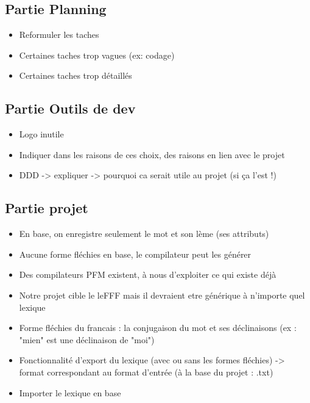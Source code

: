 \documentclass{article}
\begin{document}
\subsection{Partie Planning}
\begin{itemize}
    \item Reformuler les taches
    \item Certaines taches trop vagues (ex: codage)
    \item Certaines taches trop détaillés
\end{itemize}

\subsection{Partie Outils de dev}
\begin{itemize}
    \item Logo inutile
    \item Indiquer dans les raisons de ces choix, des raisons en lien avec le projet
    \item DDD -> expliquer ->  pourquoi ca serait utile au projet (si ça l'est !)
\end{itemize}

\subsection{Partie projet}
\begin{itemize}
    \item En base, on enregistre seulement le mot et son lème (ses attributs)
    \item Aucune forme fléchies en base, le compilateur peut les générer
    \item Des compilateurs PFM existent, à nous d'exploiter ce qui existe déjà
    \item Notre projet cible le leFFF mais il devraient etre générique à n'importe quel lexique
    \item Forme fléchies du francais : la conjugaison du mot et ses déclinaisons (ex : "mien" est une déclinaison de "moi")
    \item Fonctionnalité d'export du lexique (avec ou sans les formes fléchies) -> format correspondant au format d'entrée (à la base du projet : .txt)
    \item Importer le lexique en base
\end{itemize}
\end{document}
